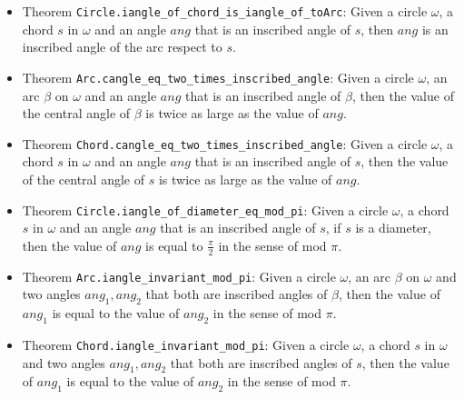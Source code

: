 \documentclass[12pt]{amsart}
\begin{document}
\begin{itemize}
    \item Theorem \verb|Circle.iangle_of_chord_is_iangle_of_toArc|: Given a circle $\omega$, a chord $s$ in $\omega$ and an angle $ang$ that is an inscribed angle of $s$, then $ang$ is an inscribed angle of the arc respect to $s$.
    \item Theorem \verb|Arc.cangle_eq_two_times_inscribed_angle|: Given a circle $\omega$, an arc $\beta$ on $\omega$ and an angle $ang$ that is an inscribed angle of $\beta$, then the value of the central angle of $\beta$ is twice as large as the value of $ang$.
    \item Theorem \verb|Chord.cangle_eq_two_times_inscribed_angle|: Given a circle $\omega$, a chord $s$ in $\omega$ and an angle $ang$ that is an inscribed angle of $s$, then the value of the central angle of $s$ is twice as large as the value of $ang$.
    \item Theorem \verb|Circle.iangle_of_diameter_eq_mod_pi|: Given a circle $\omega$, a chord $s$ in $\omega$ and an angle $ang$ that is an inscribed angle of $s$, if $s$ is a diameter, then the value of $ang$ is equal to $\frac{\pi}{2}$ in the sense of mod $\pi$.
    \item Theorem \verb|Arc.iangle_invariant_mod_pi|: Given a circle $\omega$, an arc $\beta$ on $\omega$ and two angles $ang_1, ang_2$ that both are inscribed angles of $\beta$, then the value of $ang_1$ is equal to the value of $ang_2$ in the sense of mod $\pi$.
    \item Theorem \verb|Chord.iangle_invariant_mod_pi|: Given a circle $\omega$, a chord $s$ in $\omega$ and two angles $ang_1, ang_2$ that both are inscribed angles of $s$, then the value of $ang_1$ is equal to the value of $ang_2$ in the sense of mod $\pi$.
\end{itemize}
\end{document}

